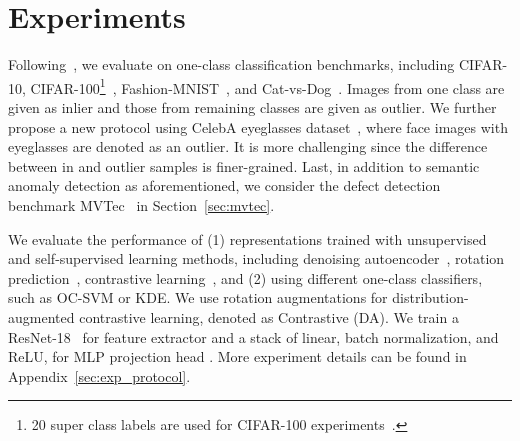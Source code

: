 \documentclass{article} \usepackage{iclr2021_conference,times}
\begin{document}
\iffalse
\subsubsection{Efficient Approximation}
\begin{itemize}
    \item Clustering
    \item Learn 1-class SVM
\end{itemize}
\fi



\vspace{-0.1in}
\section{Experiments}
\label{sec:exp}
\vspace{-0.1in}

Following~\cite{golan2018deep}, we evaluate on one-class classification benchmarks, including CIFAR-10, CIFAR-100\footnote{20 super class labels are used for CIFAR-100 experiments~\citep{golan2018deep}.}~\citep{krizhevsky2009learning}, Fashion-MNIST~\citep{xiao2017fashion}, and Cat-vs-Dog~\citep{elson2007asirra}. Images from one class are given as inlier and those from remaining classes are given as outlier.
We further propose a new protocol using CelebA eyeglasses dataset~\citep{liu2015deep}, where face images with eyeglasses are denoted as an outlier. It is more challenging since the difference between in and outlier samples is finer-grained.
Last, in addition to semantic anomaly detection as aforementioned, we consider the defect detection benchmark MVTec~\cite{bergmann2019mvtec} in Section~\ref{sec:mvtec}.  

We evaluate the performance of (1) representations trained with unsupervised and self-supervised learning methods, including denoising autoencoder~\citep{vincent2008extracting}, rotation prediction~\citep{gidaris2018unsupervised}, contrastive learning~\citep{ye2019unsupervised,chen2020simple}, and (2) using different one-class classifiers, such as OC-SVM or KDE.
We use rotation augmentations for distribution-augmented contrastive learning, denoted as Contrastive (DA).
We train a ResNet-18~\citep{he2016deep} for feature extractor  and a stack of linear, batch normalization, and ReLU, for MLP projection head . More experiment details can be found in Appendix~\ref{sec:exp_protocol}.
\end{document}
